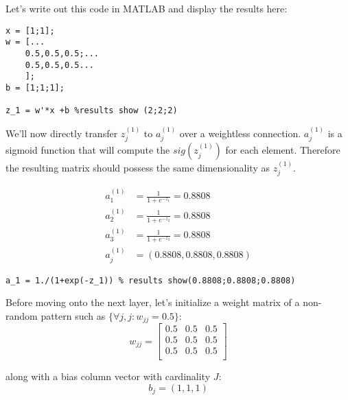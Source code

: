 \documentclass{article}
\begin{document}
Let's write out this code in MATLAB and display the results here:

\begin{lstlisting}[style=matlab, label=your-label]
x = [1;1];
w = [...
    0.5,0.5,0.5;...
    0.5,0.5,0.5...
    ];
b = [1;1;1];

z_1 = w'*x +b %results show (2;2;2)
\end{lstlisting}

We'll now directly transfer $z_j^{(1)}$ to $a_j^{(1)}$ over a weightless connection. $a_j^{(1)}$ is a sigmoid function that will compute the $sig(z_j^{(1)})$ for each element. Therefore the resulting matrix should possess the same dimensionality as $z^{(1)}_j$.

\begin{align*}
    a_1^{(1)} &= \frac{1}{1+e^{-z_1}} = 0.8808\\
    a_2^{(1)} &= \frac{1}{1+e^{-z_2}} = 0.8808\\
    a_3^{(1)} &= \frac{1}{1+e^{-z_3}} = 0.8808\\
    a_j^{(1)} &= (0.8808,0.8808,0.8808)
\end{align*}

\begin{lstlisting}[style=matlab, label=your-label]
a_1 = 1./(1+exp(-z_1)) % results show(0.8808;0.8808;0.8808)
\end{lstlisting}

Before moving onto the next layer,
let's initialize a weight matrix of a non-random pattern such as $\{\forall j,j : w_{jj} =  0.5 \}$:
\begin{equation*}
    w_{jj} =
            \begin{bmatrix}
            0.5 & 0.5 & 0.5 \\
            0.5 & 0.5 & 0.5 \\
            0.5 & 0.5 & 0.5 \\
            \end{bmatrix}
\end{equation*}

along with a bias column vector with cardinality $J$:
\begin{equation*}
    b_j = (1,1,1)
\end{equation*}
\end{document}
